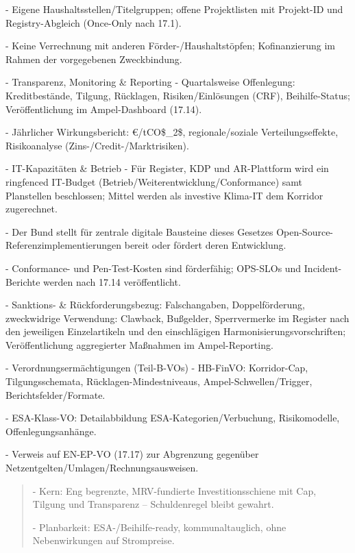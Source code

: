 \documentclass[12pt,a4paper]{scrartcl}
\begin{document}
- Eigene Haushaltsstellen/Titelgruppen; offene Projektlisten mit Projekt-ID und Registry-Abgleich (Once-Only nach 17.1).

- Keine Verrechnung mit anderen Förder-/Haushaltstöpfen; Kofinanzierung im Rahmen der vorgegebenen Zweckbindung.

- Transparenz, Monitoring \& Reporting
- Quartalsweise Offenlegung: Kreditbestände, Tilgung, Rücklagen, Risiken/Einlösungen (CRF), Beihilfe-Status; Veröffentlichung im Ampel-Dashboard (17.14).

- Jährlicher Wirkungsbericht: €/tCO\$\_2\$, regionale/soziale Verteilungseffekte, Risikoanalyse (Zins-/Credit-/Marktrisiken).

- IT-Kapazitäten \& Betrieb
- Für Register, KDP und AR-Plattform wird ein ringfenced IT-Budget (Betrieb/Weiterentwicklung/Conformance) samt Planstellen beschlossen; Mittel werden als investive Klima-IT dem Korridor zugerechnet.

- Der Bund stellt für zentrale digitale Bausteine dieses Gesetzes Open-Source-Referenzimplementierungen bereit oder fördert deren Entwicklung.

- Conformance- und Pen-Test-Kosten sind förderfähig; OPS-SLOs und Incident-Berichte werden nach 17.14 veröffentlicht.

- Sanktions- \& Rückforderungsbezug: Falschangaben, Doppelförderung, zweckwidrige Verwendung: Clawback, Bußgelder, Sperrvermerke im Register nach den jeweiligen Einzelartikeln und den einschlägigen Harmonisierungsvorschriften; Veröffentlichung aggregierter Maßnahmen im Ampel-Reporting.

- Verordnungsermächtigungen (Teil-B-VOs)
- HB-FinVO: Korridor-Cap, Tilgungsschemata, Rücklagen-Mindestniveaus, Ampel-Schwellen/Trigger, Berichtsfelder/Formate.

- ESA-Klass-VO: Detailabbildung ESA-Kategorien/Verbuchung, Risikomodelle, Offenlegungsanhänge.

- Verweis auf EN-EP-VO (17.17) zur Abgrenzung gegenüber Netzentgelten/Umlagen/Rechnungsausweisen.

{\footnotesize\begin{quote}
- Kern: Eng begrenzte, MRV-fundierte Investitionsschiene mit Cap, Tilgung und Transparenz -- Schuldenregel bleibt gewahrt.

- Planbarkeit: ESA-/Beihilfe-ready, kommunaltauglich, ohne Nebenwirkungen auf Strompreise.
\end{quote}}



\end{document}
